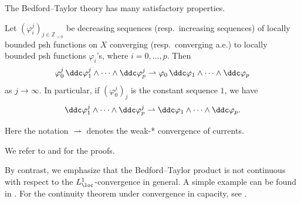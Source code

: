 The Bedford--Taylor theory has many satisfactory properties.

\begin{theorem}\label{thm:contMA}
    Let $(\varphi_i^j)_{j\in \mathbb{Z}_{>0}}$ be decreasing sequences (resp.\ increasing sequences) of locally bounded psh functions on $X$ converging (resp.\ converging a.e.) to locally bounded psh functions $\varphi_i$'s, where $i=0,\ldots,p$. Then
    \[
    \varphi_0^j\, \ddc \varphi_1^j\wedge \cdots \wedge \ddc\varphi_p^j\rightharpoonup \varphi_0\, \ddc \varphi_1\wedge \cdots \wedge \ddc\varphi_p
    \]
    as $j\to\infty$. In particular, if $(\varphi_0^j)_j$ is the constant sequence $1$, we have
    \[
    \ddc \varphi_1^j\wedge \cdots \wedge \ddc\varphi_p^j\rightharpoonup \ddc \varphi_1\wedge \cdots \wedge \ddc\varphi_p.
    \]
\end{theorem}
Here the notation $\rightharpoonup$ denotes the weak-* convergence of currents.

We refer to \cite[Theorem~3.18, Theorem~3.23]{GZ17} and \cite[Theorems~9.2.5 and~9.5.1]{FPT} for the proofs.

By contrast, we emphasize that the Bedford--Taylor product is not continuous with respect to the $L^1_{\loc}$-convergence in general. A simple example can be found in \cite[Example~3.25]{GZ17}. For the continuity theorem under convergence in capacity, see \cite[Theorem~9.4.8]{FPT}.

